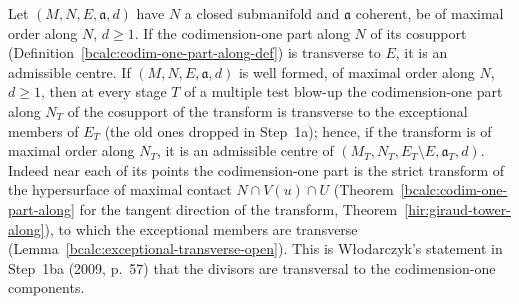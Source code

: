 \begin{corollary}
\label{bcalc:codim-one-admissible-along}
\mixedleanok
Let \((M,N,E,\mathfrak a,d)\) have \(N\) a closed submanifold and \(\mathfrak a\) coherent, be of maximal order along \(N\), \(d\ge1\). If the codimension-one part along \(N\) of its cosupport
(Definition~\ref{bcalc:codim-one-part-along-def}) is transverse to \(E\), it is an admissible centre. If \((M,N,E,\mathfrak a,d)\) is well formed, of
maximal order along \(N\), \(d\ge1\), then at every stage \(T\) of a multiple test blow-up the codimension-one part along \(N_T\) of the cosupport of the
transform is transverse to the exceptional members of \(E_T\) (the old ones dropped in Step~1a); hence, if the transform is of maximal order along \(N_T\), it is
an admissible centre of \((M_T,N_T,E_T\setminus E,\mathfrak a_T,d)\). Indeed near each of its points the codimension-one part is the strict transform of
the hypersurface of maximal contact \(N\cap V(u)\cap U\) (Theorem~\ref{bcalc:codim-one-part-along} for the tangent direction of the transform,
Theorem~\ref{hir:giraud-tower-along}), to which the exceptional members are transverse (Lemma~\ref{bcalc:exceptional-transverse-open}). This is Włodarczyk's
statement in Step~1ba (2009, p.~57) that the divisors are transversal to the codimension-one components.
\end{corollary}
